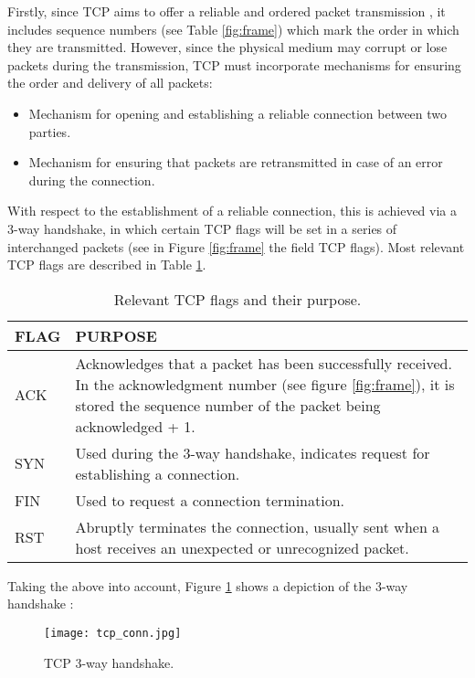 Firstly, since TCP aims to offer a reliable and ordered packet transmission \cite{tcp_reliable}, it includes sequence numbers (see Table \ref{fig:frame}) which mark the order in which they are transmitted. However, since the physical medium may corrupt or lose packets during the transmission, TCP must incorporate mechanisms for ensuring the order and delivery of all packets:
\begin{itemize}
\item Mechanism for opening and establishing a reliable connection between two parties.
\item Mechanism for ensuring that packets are retransmitted in case of an error during the connection.
\end{itemize}

With respect to the establishment of a reliable connection, this is achieved via a 3-way handshake, in which certain TCP flags will be set in a series of interchanged packets (see in Figure \ref{fig:frame} the field TCP flags). Most relevant TCP flags are described in Table \ref{table:tcp_flags}.

\begin{table}[htbp]
\begin{tabular}{|>{\centering\arraybackslash}p{3cm}|>{\centering\arraybackslash}p{10cm}|}
\hline
\textbf{FLAG} & \textbf{PURPOSE}\\
\hline
\hline
ACK & Acknowledges that a packet has been successfully received. In the acknowledgment number (see figure \ref{fig:frame}), it is stored the sequence number of the packet being acknowledged + 1. \\
\hline
SYN & Used during the 3-way handshake, indicates request for establishing a connection.\\
\hline
FIN & Used to request a connection termination.\\
\hline
RST & Abruptly terminates the connection, usually sent when a host receives an unexpected or unrecognized packet.\\
\hline
\end{tabular}
\caption{Relevant TCP flags and their purpose.}
\label{table:tcp_flags}
\end{table}

Taking the above into account, Figure \ref{fig:tcp_conn} shows a depiction of the 3-way handshake \cite{tcp_handshake}:
\begin{figure}[htbp]
	\centering
	\texttt{[image: tcp\_conn.jpg]}
	\caption{TCP 3-way handshake.}
	\label{fig:tcp_conn}
\end{figure}

